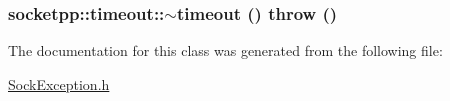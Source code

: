 \hypertarget{classsocketpp_1_1timeout_8593bc6e69d1f62e41332e4b3809b3e7}{
\subsubsection[{$\sim$timeout}]{\setlength{\rightskip}{0pt plus 5cm}socketpp::timeout::$\sim$timeout ()  throw ()}}
\label{classsocketpp_1_1timeout_8593bc6e69d1f62e41332e4b3809b3e7}




The documentation for this class was generated from the following file:\begin{CompactItemize}
\item 
\hyperlink{SockException_8h}{SockException.h}\end{CompactItemize}
